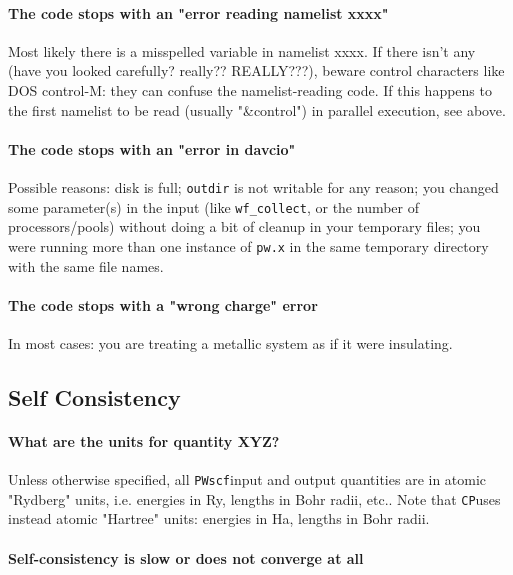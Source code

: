 \documentclass[12pt,a4paper]{article}
\def\PWscf{\texttt{PWscf}}
\def\CP{\texttt{CP}}
\begin{document}
\paragraph{The code stops with an "error reading namelist xxxx"}

Most likely there is a misspelled variable in namelist xxxx.
If there isn't any (have you looked carefully? really?? REALLY???), 
beware control characters like DOS control-M: they can confuse
the namelist-reading code. If this happens to the first namelist 
to be read (usually "\&control") in parallel execution, see above.

\paragraph{The code stops with an "error in davcio"}

Possible reasons: disk is full; \texttt{outdir} is not writable for
any reason; you changed some parameter(s) in the input (like 
\texttt{wf\_collect}, or the number of processors/pools) without 
doing a bit of cleanup in your temporary files; you were running 
more than one instance of \texttt{pw.x} in the same temporary
directory with the same file names. 

\paragraph{The code stops with a "wrong charge" error}

In most cases: you are treating a metallic system
as if it were insulating.

\subsection{Self Consistency}

\paragraph{What are the units for quantity XYZ?}

Unless otherwise specified, all \PWscf input and output
quantities are in atomic "Rydberg" units, i.e. energies in Ry, lengths
in Bohr radii, etc.. Note that \CP uses instead atomic "Hartree" 
units: energies in Ha, lengths in Bohr radii. 

\paragraph{Self-consistency is slow or does not converge at all}
\end{document}
